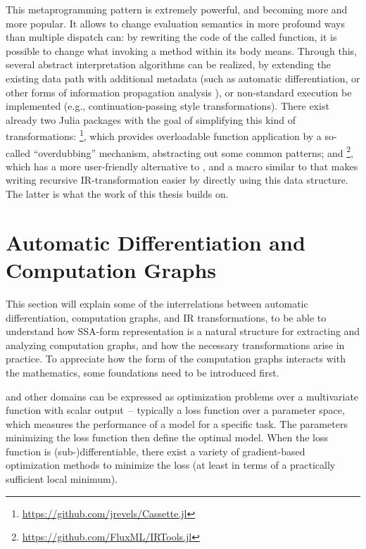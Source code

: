 This metaprogramming pattern is extremely powerful, and becoming more and more popular.  It allows
to change evaluation semantics in more profound ways than multiple dispatch can: by rewriting the
code of the called function, it is possible to change what invoking a method within its body means.
Through this, several abstract interpretation algorithms can be realized, by extending the existing
data path with additional metadata (such as automatic differentiation, or other forms of information
propagation analysis \parencite[part II]{singer2018static}), or non-standard execution be
implemented (e.g., continuation-passing style transformations).  There exist already two Julia
packages with the goal of simplifying this kind of transformations:
\footnote{\protect\url{https://github.com/jrevels/Cassette.jl}}, which
provides overloadable function application by a so-called \enquote{overdubbing} mechanism,
abstracting out some common patterns; and
\footnote{\protect\url{https://github.com/FluxML/IRTools.jl}}, which has a
more user-friendly alternative to , and a macro similar to  that
makes writing recursive IR-transformation easier by directly using this data structure.  The latter
is what the work of this thesis builds on.


\section[Automatic Differentiation and Computation Graphs]{Automatic Differentiation and \newline
  Computation Graphs}
\label{sec:cg-ad}

This section will explain some of the interrelations between automatic differentiation, computation
graphs, and IR transformations, to be able to understand how SSA-form representation is a natural
structure for extracting and analyzing computation graphs, and how the necessary transformations
arise in practice.  To appreciate how the form of the computation graphs interacts with the
mathematics, some foundations need to be introduced first.

 and other domains can be expressed as optimization
problems over a multivariate function with scalar output~-- typically a loss function over a
parameter space, which measures the performance of a model for a specific task.  The parameters
minimizing the loss function then define the optimal model.  When the loss function is
(sub-)differentiable, there exist a variety of gradient-based optimization methods to minimize the
loss (at least in terms of a practically sufficient local minimum).

